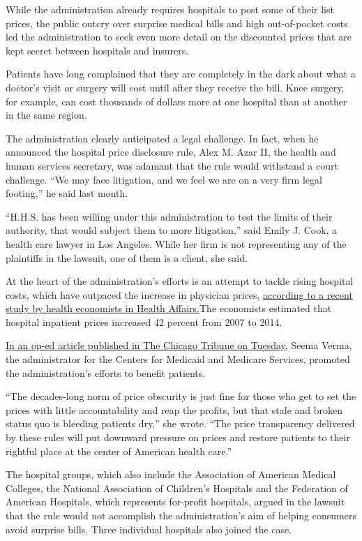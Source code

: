 While the administration already requires hospitals to post some of
their list prices, the public outcry over surprise medical bills and
high out-of-pocket costs led the administration to seek even more detail
on the discounted prices that are kept secret between hospitals and
insurers.

Patients have long complained that they are completely in the dark about
what a doctor's visit or surgery will cost until after they receive the
bill. Knee surgery, for example, can cost thousands of dollars more at
one hospital than at another in the same region.

The administration clearly anticipated a legal challenge. In fact, when
he announced the hospital price disclosure rule, Alex M. Azar II, the
health and human services secretary, was adamant that the rule would
withstand a court challenge. ``We may face litigation, and we feel we
are on a very firm legal footing,'' he said last month.

``H.H.S. has been willing under this administration to test the limits
of their authority, that would subject them to more litigation,'' said
Emily J. Cook, a health care lawyer in Los Angeles. While her firm is
not representing any of the plaintiffs in the lawsuit, one of them is a
client, she said.

At the heart of the administration's efforts is an attempt to tackle
rising hospital costs, which have outpaced the increase in physician
prices,
\href{https://www.healthaffairs.org/doi/10.1377/hlthaff.2018.05424}{according
to a recent study by health economists in Health Affairs.}The economists
estimated that hospital inpatient prices increased 42 percent from 2007
to 2014.

\href{https://www.chicagotribune.com/opinion/commentary/ct-opinion-health-care-prices-20191203-mpphzha4ofhwhftwid3od4mxoi-story.html}{In
an op-ed article published in The Chicago Tribune on Tuesday}, Seema
Verma, the administrator for the Centers for Medicaid and Medicare
Services, promoted the administration's efforts to benefit patients.

``The decades-long norm of price obscurity is just fine for those who
get to set the prices with little accountability and reap the profits,
but that stale and broken status quo is bleeding patients dry,'' she
wrote. ``The price transparency delivered by these rules will put
downward pressure on prices and restore patients to their rightful place
at the center of American health care.''

The hospital groups, which also include the Association of American
Medical Colleges, the National Association of Children's Hospitals and
the Federation of American Hospitals, which represents for-profit
hospitals, argued in the lawsuit that the rule would not accomplish the
administration's aim of helping consumers avoid surprise bills. Three
individual hospitals also joined the case.

